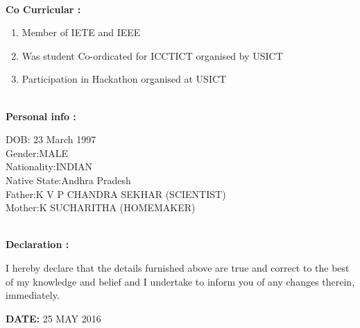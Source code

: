 \documentclass{article}
\begin{document}
\leavevmode\\
	\textbf{Co Curricular :}
	\begin{enumerate}
		\item Member of IETE and IEEE
		\item Was student Co-ordicated for ICCTICT organised by USICT
		\item Participation in Hackathon organised at USICT
		
		\end{enumerate}
\leavevmode
\\
\textbf{Personal info :}
		\begin{flushleft}
		
			DOB: \hfill23 March 1997\\
			Gender:\hfill MALE\\
			Nationality:\hfill INDIAN\\
			Native State:\hfill Andhra Pradesh\\
		    Father:\hfill K V P  CHANDRA SEKHAR (SCIENTIST)\\
	     	Mother:\hfill K SUCHARITHA   (HOMEMAKER)\\
		
		\end{flushleft}
\leavevmode
\\
\leavevmode
\textbf{Declaration :}
	\begin{flushleft}
		I hereby declare that the details furnished above are true and correct to the best of my knowledge
		and belief and I undertake to inform you of any changes therein, immediately.
	\end{flushleft}	 

\begin{flushright}
	\textbf{DATE:} 25 MAY 2016
\end{flushright}
\end{document}
